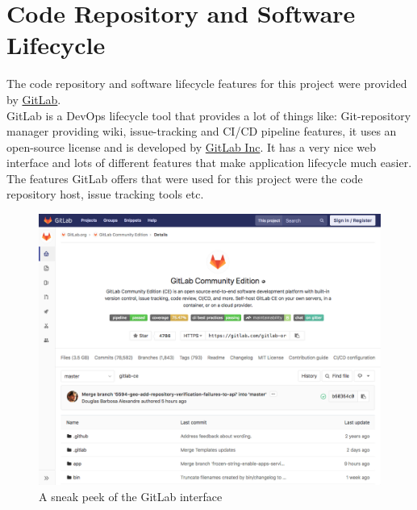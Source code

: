 \section{Code Repository and Software Lifecycle}
\label{sec:GitLab}
The code repository and software lifecycle features for this project were provided by \href{https://gitlab.com/}{GitLab}.\\
GitLab is a DevOps lifecycle tool that provides a lot of things like: Git-repository manager providing wiki, issue-tracking and CI/CD pipeline features, it uses an open-source license and is developed by \href{https://about.gitlab.com/company/}{GitLab Inc}.
It has a very nice web interface and lots of different features that make application lifecycle much easier. The features GitLab offers that were used for this project were the code repository host, issue tracking tools etc.\\
\begin{figure}[H]
	\includegraphics[width=\linewidth]{./Images/Implementation/gitlab_view.png}
	\caption{A sneak peek of the GitLab interface}
\end{figure}	
\newpage
